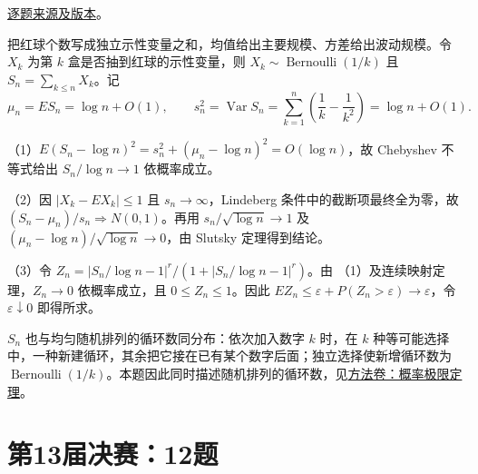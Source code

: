 \documentclass[UTF8,12pt,a4paper,fontset=fandol]{ctexbook}
\begin{document}
\href{https://github.com/lzxcr/cmc-mathematics/blob/64916fa1fdbc3e444a652eca204d5669058ee321/src/problems/finals/12/14.md}{逐题来源及版本}。

\begin{solve}

把红球个数写成独立示性变量之和，均值给出主要规模、方差给出波动规模。令 $X_k$ 为第 $k$ 盒是否抽到红球的示性变量，则 $X_k\sim\operatorname{Bernoulli}(1/k)$ 且 $S_n=\sum_{k\leq n}X_k$。记
\[
\mu_n=ES_n=\log n+O(1),\qquad
s_n^2=\operatorname{Var}S_n=\sum_{k=1}^n\left(\frac1k-\frac1{k^2}\right)=\log n+O(1).
\]

（1）$E(S_n-\log n)^2=s_n^2+(\mu_n-\log n)^2=O(\log n)$，故 Chebyshev 不等式给出 $S_n/\log n\to1$ 依概率成立。

（2）因 $|X_k-EX_k|\leq1$ 且 $s_n\to\infty$，Lindeberg 条件中的截断项最终全为零，故 $(S_n-\mu_n)/s_n\Rightarrow N(0,1)$。再用 $s_n/\sqrt{\log n}\to1$ 及 $(\mu_n-\log n)/\sqrt{\log n}\to0$，由 Slutsky 定理得到结论。

（3）令 $Z_n=|S_n/\log n-1|^r/(1+|S_n/\log n-1|^r)$。由 （1）及连续映射定理，$Z_n\to0$ 依概率成立，且 $0\leq Z_n\leq1$。因此 $EZ_n\leq\varepsilon+P(Z_n>\varepsilon)\to\varepsilon$，令 $\varepsilon\downarrow0$ 即得所求。

\end{solve}

\begin{remark}[方法与条件]

$S_n$ 也与均匀随机排列的循环数同分布：依次加入数字 $k$ 时，在 $k$ 种等可能选择中，一种新建循环，其余把它接在已有某个数字后面；独立选择使新增循环数为 $\operatorname{Bernoulli}(1/k)$。本题因此同时描述随机排列的循环数，见\hyperref[app:probability-limit]{方法卷：概率极限定理}。

\end{remark}

\section{第13届决赛：12题}\label{pr:fin13-high:12}
\end{document}
